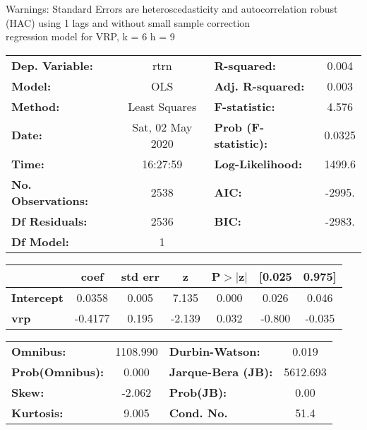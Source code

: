 Warnings: \newline
 [1] Standard Errors are heteroscedasticity and autocorrelation robust (HAC) using 1 lags and without small sample correction\\ 

regression model for VRP, k = 6 h = 9\begin{center}
\begin{tabular}{lclc}
\toprule
\textbf{Dep. Variable:}    &       rtrn       & \textbf{  R-squared:         } &     0.004   \\
\textbf{Model:}            &       OLS        & \textbf{  Adj. R-squared:    } &     0.003   \\
\textbf{Method:}           &  Least Squares   & \textbf{  F-statistic:       } &     4.576   \\
\textbf{Date:}             & Sat, 02 May 2020 & \textbf{  Prob (F-statistic):} &   0.0325    \\
\textbf{Time:}             &     16:27:59     & \textbf{  Log-Likelihood:    } &    1499.6   \\
\textbf{No. Observations:} &        2538      & \textbf{  AIC:               } &    -2995.   \\
\textbf{Df Residuals:}     &        2536      & \textbf{  BIC:               } &    -2983.   \\
\textbf{Df Model:}         &           1      & \textbf{                     } &             \\
\bottomrule
\end{tabular}
\begin{tabular}{lcccccc}
                   & \textbf{coef} & \textbf{std err} & \textbf{z} & \textbf{P$> |$z$|$} & \textbf{[0.025} & \textbf{0.975]}  \\
\midrule
\textbf{Intercept} &       0.0358  &        0.005     &     7.135  &         0.000        &        0.026    &        0.046     \\
\textbf{vrp}       &      -0.4177  &        0.195     &    -2.139  &         0.032        &       -0.800    &       -0.035     \\
\bottomrule
\end{tabular}
\begin{tabular}{lclc}
\textbf{Omnibus:}       & 1108.990 & \textbf{  Durbin-Watson:     } &    0.019  \\
\textbf{Prob(Omnibus):} &   0.000  & \textbf{  Jarque-Bera (JB):  } & 5612.693  \\
\textbf{Skew:}          &  -2.062  & \textbf{  Prob(JB):          } &     0.00  \\
\textbf{Kurtosis:}      &   9.005  & \textbf{  Cond. No.          } &     51.4  \\
\bottomrule
\end{tabular}
\end{center}

